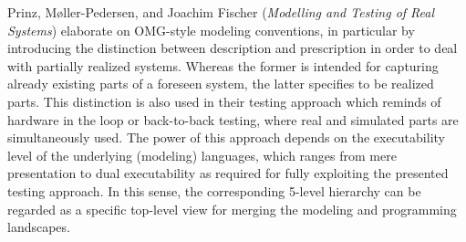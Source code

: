 


Prinz, M{\o}ller-Pedersen, and Joachim Fischer
\cite{isola-2016-prinz}
({\em Modelling and Testing of Real Systems})
elaborate on OMG-style modeling conventions, in particular by introducing the distinction between description and prescription in order to deal with partially realized systems. Whereas the former is intended for capturing already existing parts of a foreseen system, the latter specifies to be realized parts. This distinction is also used in their testing approach which reminds of hardware in the loop or back-to-back testing, where real and simulated parts are simultaneously used. The power of this approach depends on the executability level of the underlying (modeling) languages, which ranges from mere presentation to dual executability as required for fully exploiting the presented testing approach. In this sense, the corresponding 5-level hierarchy can be regarded as a specific top-level view for merging the modeling and programming landscapes.

